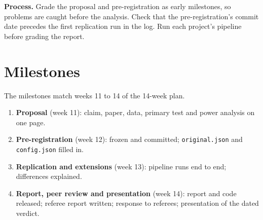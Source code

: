\textbf{Process.} Grade the proposal and pre-registration as early milestones, so problems are caught before the analysis. Check that the pre-registration's commit date precedes the first replication run in the log. Run each project's pipeline before grading the report.

\section*{Milestones}

\noindent The milestones match weeks 11 to 14 of the 14-week plan.

\begin{enumerate}
  \item \textbf{Proposal} (week 11): claim, paper, data, primary test and power analysis on one page.
  \item \textbf{Pre-registration} (week 12): frozen and committed; \texttt{original.json} and \texttt{config.json} filled in.
  \item \textbf{Replication and extensions} (week 13): pipeline runs end to end; differences explained.
  \item \textbf{Report, peer review and presentation} (week 14): report and code released; referee report written; response to referees; presentation of the dated verdict.
\end{enumerate}

